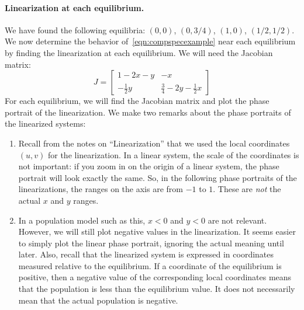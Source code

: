 \documentclass[reqno]{immbook}
\begin{document}
\paragraph{Linearization at each equilibrium.}
We have found the following equilibria: $(0,0)$, $(0,3/4)$, $(1,0)$, $(1/2,1/2)$.
We now determine the behavior of~\eqref{eqn:compspecexample}
near each equilibrium by finding the linearization at each
equilibrium.
We will need the Jacobian matrix:
\begin{equation}
  J = \begin{bmatrix}
          1-2x-y & -x \\
	  -\frac{1}{2}y & \frac{3}{4}-2y-\frac{1}{2}x
      \end{bmatrix}
\end{equation}
For each equilibrium, we will find the Jacobian matrix
and plot the phase portrait of the linearization.
We make two remarks about the phase portraits of the linearized
systems:
\begin{enumerate}
\item
Recall from the notes on ``Linearization'' that we
used the local coordinates $(u,v)$ for the linearization.
In a linear system, the scale of the coordinates is not
important: if you zoom in on the origin of a linear system,
the phase portrait will look exactly the same.
So, in the following phase portraits of the linearizations,
the ranges on the axis are  from $-1$ to $1$.  These
are \emph{not} the actual $x$ and $y$ ranges.
\item
In a population model such as this, $x<0$ and $y<0$
are not relevant.  However, we will still plot negative
values in the linearization.  It seems easier to simply
plot the linear phase portrait, ignoring the actual
meaning until later.  Also, recall that the linearized
system is expressed in coordinates measured relative
to the equilibrium.  If a coordinate of the equilibrium
is positive, then a negative value of the corresponding
local coordinates means that the population is less than
the equilibrium value. It does not necessarily mean that
the actual population is negative.
\end{enumerate}

\medskip
\end{document}

